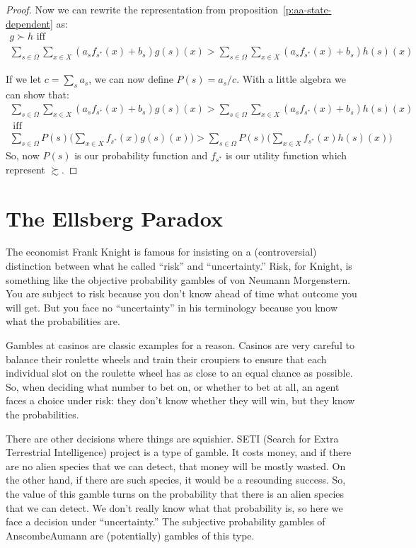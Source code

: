 \begin{proof}
Now we can rewrite the representation from proposition~\ref{p:aa-state-dependent} as:
\begin{multline*}
    g \succ h \text{ iff } \\ \sum_{s \in \Omega} \sum_{x \in X} (a_s f_{s^*}(x) + b_s) g(s)(x) > \sum_{s \in \Omega} \sum_{x \in X} (a_s f_{s^*}(x) + b_s)h(s)(x)
\end{multline*}

If we let $c = \sum_s a_s$, we can now define $P(s) = a_s / c$. With a little algebra we can show that: 
\begin{multline*}
    \sum_{s \in \Omega} \sum_{x \in X} (a_s f_{s^*}(x) + b_s) g(s)(x) > \sum_{s \in \Omega} \sum_{x \in X} (a_s f_{s^*}(x) + b_s)h(s)(x) \\ \text{ iff } \\
    \sum_{s \in \Omega} P(s) \big (\sum_{x \in X}  f_{s^*}(x) g(s)(x)\big) > \sum_{s \in \Omega} P(s) \big( \sum_{x \in X} f_{s^*}(x) h(s)(x) \big)
\end{multline*}
So, now $P(s)$ is our probability function and $f_{s^*}$ is our utility function which represent $\succsim$.
\end{proof}

\section{The Ellsberg Paradox}

The economist Frank Knight is famous for insisting on a (controversial) distinction between what he called ``risk'' and ``uncertainty.'' Risk, for Knight, is something like the objective probability gambles of von Neumann\breakslash 
Morgenstern.  You are subject to risk because you don't know ahead of time what outcome you will get.  But you face no ``uncertainty'' in his terminology because you know what the probabilities are.  

Gambles at casinos are classic examples for a reason.  Casinos are very careful to balance their roulette wheels and train their croupiers to ensure that each individual slot on the roulette wheel has as close to an equal chance as possible. So, when deciding what number to bet on, or whether to bet at all, an agent faces a choice under risk: they don't know whether they will win, but they know the probabilities.

There are other decisions where things are squishier.  SETI (Search for Extra Terrestrial Intelligence) project is a type of gamble.  It costs money, and if there are no alien species that we can detect, that money will be mostly wasted.  On the other hand, if there are such species, it would be a resounding success.  So, the value of this gamble turns on the probability that there is an alien species that we can detect.  We don't really know what that probability is, so here we face a decision under ``uncertainty.'' The subjective probability gambles of Anscombe\breakslash Aumann are (potentially) gambles of this type.

